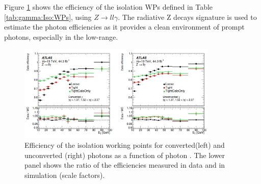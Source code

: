 Figure \ref{fig:gamma:Iso:Eff} shows the efficiency of the isolation WPs defined in Table \ref{tab:gamma:Iso:WPs}, using $Z\rightarrow ll\gamma$. The radiative Z decays signature is used to estimate the photon efficiencies as it provides a clean environment of prompt photons, especially in the low-\eT range. 
\begin{figure}[htbp]
    \centering
    \includegraphics[width=0.85\textwidth]{Ch3/Img/Photon_Iso_Eff.png}
    \caption{Efficiency of the isolation working points for converted(left) and unconverted (right) photons as a function of photon \eT. The lower panel shows the ratio of the efficiencies measured in data and in simulation (scale factors).}
    \label{fig:gamma:Iso:Eff}
\end{figure}


